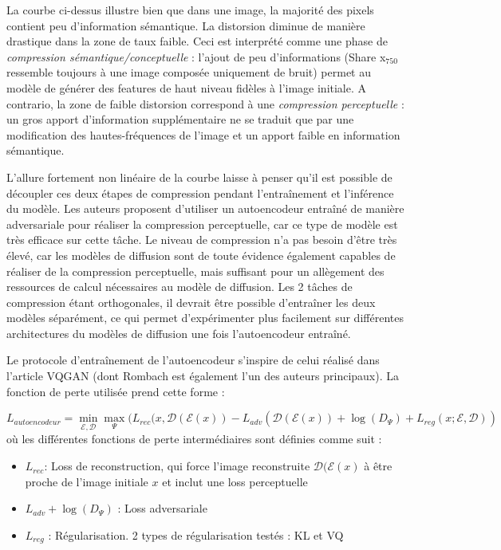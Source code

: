 \documentclass{article}
\begin{document}
La courbe ci-dessus illustre bien que dans une image, la majorité des pixels contient peu d'information sémantique. La distorsion diminue de manière drastique dans la zone de taux faible. Ceci est interprété comme une phase de \textit{compression sémantique/conceptuelle} : l'ajout de peu d'informations (Share x$_{750}$ ressemble toujours à une image composée uniquement de bruit) permet au modèle de générer des features de haut niveau fidèles à l'image initiale. A contrario, la zone de faible distorsion correspond à une \textit{compression perceptuelle} : un gros apport d'information supplémentaire ne se traduit que par une modification des hautes-fréquences de l'image et un apport faible en information sémantique. \par
L'allure fortement non linéaire de la courbe laisse à penser qu'il est possible de découpler ces deux étapes de compression pendant l'entraînement et l'inférence du modèle. Les auteurs proposent d'utiliser un autoencodeur entraîné de manière adversariale pour réaliser la compression perceptuelle, car ce type de modèle est très efficace sur cette tâche. Le niveau de compression n'a pas besoin d'être très élevé, car les modèles de diffusion sont de toute évidence également capables de réaliser de la compression perceptuelle, mais suffisant pour un allègement des ressources de calcul nécessaires au modèle de diffusion. Les 2 tâches de compression étant orthogonales, il devrait être possible d'entraîner les deux modèles séparément, ce qui permet d'expérimenter plus facilement sur différentes architectures du modèles de diffusion une fois l'autoencodeur entraîné. \par
\begin{spacing}{1}
Le protocole d'entraînement de l'autoencodeur s'inspire de celui réalisé dans l'article VQGAN \cite{VQGAN} (dont Rombach est également l'un des auteurs principaux). La fonction de perte utilisée prend cette forme :
\end{spacing}
\large
\vspace{-0.5cm}
$$
L_{autoencodeur} = \min_{\mathcal{E}, \mathcal{D}} \max_{\Psi} (L_{rec}(x, \mathcal{D}(\mathcal{E}(x)) - L_{adv}(\mathcal{D}(\mathcal{E}(x)) + \log(D_{\Psi}) + L_{reg}(x;\mathcal{E}, \mathcal{D}) )
$$
\normalsize
où les différentes fonctions de perte intermédiaires sont définies comme suit :
\begin{itemize}
    \item $L_{rec}$: Loss de reconstruction, qui force l'image reconstruite $\mathcal{D}(\mathcal{E}(x)$ à être proche de l'image initiale $x$ et inclut une loss perceptuelle \cite{Perceptual_loss}
    \item $L_{adv} + \log(D_{\Psi})$ : Loss adversariale
    \item $L_{reg}$ : Régularisation. 2 types de régularisation testés : KL et VQ
\end{itemize}
\end{document}
